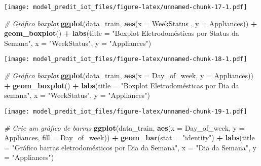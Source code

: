 \documentclass[
]{article}
\newenvironment{Shaded}{\begin{snugshade}}{\end{snugshade}}
\newcommand{\AttributeTok}[1]{\textcolor[rgb]{0.13,0.29,0.53}{#1}}
\newcommand{\CommentTok}[1]{\textcolor[rgb]{0.56,0.35,0.01}{\textit{#1}}}
\newcommand{\FunctionTok}[1]{\textcolor[rgb]{0.13,0.29,0.53}{\textbf{#1}}}
\newcommand{\NormalTok}[1]{#1}
\newcommand{\SpecialCharTok}[1]{\textcolor[rgb]{0.81,0.36,0.00}{\textbf{#1}}}
\newcommand{\StringTok}[1]{\textcolor[rgb]{0.31,0.60,0.02}{#1}}
\begin{document}
\texttt{[image: model\_predit\_iot\_files/figure-latex/unnamed-chunk-17-1.pdf]}

\begin{Shaded}
\begin{Highlighting}[]
\CommentTok{\# Gráfico boxplot }
\FunctionTok{ggplot}\NormalTok{(data\_train, }\FunctionTok{aes}\NormalTok{(}\AttributeTok{x =}\NormalTok{ WeekStatus , }\AttributeTok{y =}\NormalTok{ Appliances)) }\SpecialCharTok{+}
  \FunctionTok{geom\_boxplot}\NormalTok{() }\SpecialCharTok{+}
  \FunctionTok{labs}\NormalTok{(}\AttributeTok{title =} \StringTok{"Boxplot Eletrodomésticas por Status da Semana"}\NormalTok{, }\AttributeTok{x =} \StringTok{"WeekStatus"}\NormalTok{, }\AttributeTok{y =} \StringTok{"Appliances"}\NormalTok{)}
\end{Highlighting}
\end{Shaded}

\texttt{[image: model\_predit\_iot\_files/figure-latex/unnamed-chunk-18-1.pdf]}

\begin{Shaded}
\begin{Highlighting}[]
\CommentTok{\# Gráfico boxplot }
\FunctionTok{ggplot}\NormalTok{(data\_train, }\FunctionTok{aes}\NormalTok{(}\AttributeTok{x =}\NormalTok{ Day\_of\_week, }\AttributeTok{y =}\NormalTok{ Appliances)) }\SpecialCharTok{+}
  \FunctionTok{geom\_boxplot}\NormalTok{() }\SpecialCharTok{+}
  \FunctionTok{labs}\NormalTok{(}\AttributeTok{title =} \StringTok{"Boxplot Eletrodomésticas por Dia da semana"}\NormalTok{, }\AttributeTok{x =} \StringTok{"WeekStatus"}\NormalTok{, }\AttributeTok{y =} \StringTok{"Appliances"}\NormalTok{)}
\end{Highlighting}
\end{Shaded}

\texttt{[image: model\_predit\_iot\_files/figure-latex/unnamed-chunk-19-1.pdf]}

\begin{Shaded}
\begin{Highlighting}[]
\CommentTok{\# Crie um gráfico de barras}
\FunctionTok{ggplot}\NormalTok{(data\_train, }\FunctionTok{aes}\NormalTok{(}\AttributeTok{x =}\NormalTok{ Day\_of\_week, }\AttributeTok{y =}\NormalTok{ Appliances, }\AttributeTok{fill =}\NormalTok{ Day\_of\_week)) }\SpecialCharTok{+}
  \FunctionTok{geom\_bar}\NormalTok{(}\AttributeTok{stat =} \StringTok{"identity"}\NormalTok{) }\SpecialCharTok{+}
  \FunctionTok{labs}\NormalTok{(}\AttributeTok{title =} \StringTok{"Gráfico barras eletrodomésticos por Dia da Semana"}\NormalTok{,}
       \AttributeTok{x =} \StringTok{"Dia da Semana"}\NormalTok{,}
       \AttributeTok{y =} \StringTok{"Appliances"}\NormalTok{)}
\end{Highlighting}
\end{Shaded}
\end{document}
